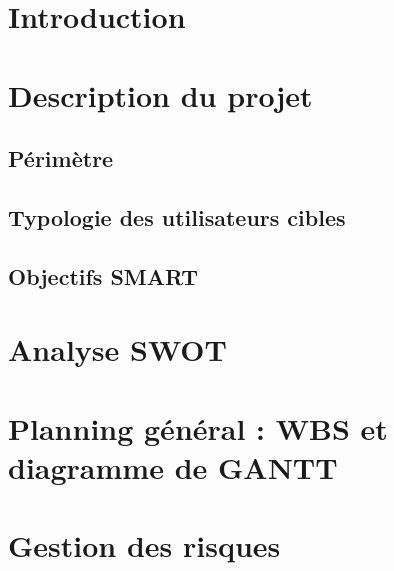 \documentclass[a4paper,12pt]{article}
\begin{document}


\section{Introduction} %



\section{Description du projet}

\subsection{Périmètre}

\subsection{Typologie des utilisateurs cibles}

\subsection{Objectifs SMART}

\section{Analyse SWOT}



\section{Planning général : WBS et diagramme de GANTT}



\section{Gestion des risques}
\end{document}

